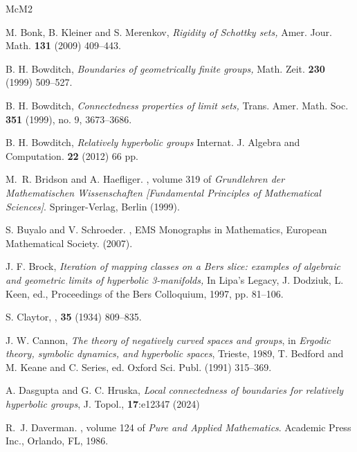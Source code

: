 \documentclass[11pt]{article}
\theoremstyle{definition}
\begin{document}
\begin{thebibliography}{McM2}

 M. Bonk, B. Kleiner and S. Merenkov, {\em Rigidity of Schottky sets,} Amer. Jour. Math. {\bf 131} (2009) 409--443.   



 B. H. Bowditch, {\it Boundaries of geometrically finite groups,} Math.  Zeit. {\bf 230} (1999) 509--527. 

 B. H.  Bowditch, {\it Connectedness properties of limit sets,} Trans. Amer. Math. Soc. {\bf 351} (1999), no. 9, 3673--3686. 

 B. H. Bowditch, {\em Relatively hyperbolic groups} Internat. J. Algebra and Computation. {\bf 22} (2012) 66 pp. 


M.~R. Bridson and A. Haefliger.
, volume 319 of {\em
  Grundlehren der Mathematischen Wissenschaften [Fundamental Principles of
  Mathematical Sciences]}.
\newblock Springer-Verlag, Berlin (1999).

S. Buyalo and V. Schroeder. 
, 
EMS Monographs in Mathematics, European Mathematical Society. (2007). 

 J. F. Brock, {\it Iteration of mapping classes on a Bers slice: examples of algebraic and geometric limits of hyperbolic 3-manifolds,} In Lipa's Legacy, J. Dodziuk, L. Keen, ed., Proceedings of the Bers Colloquium, 1997, pp. 81--106.

S. Claytor,
,
 {\bf 35} (1934) 809--835.

 J. W. Cannon,
{\it The theory of negatively curved spaces and groups}, in {\it Ergodic theory, symbolic dynamics, and hyperbolic spaces}, Trieste, 1989,
T. Bedford and M. Keane and C. Series, ed. 
Oxford Sci. Publ. (1991) 315--369. 
 


 A. Dasgupta and G. C. Hruska, {\it Local connectedness of boundaries for relatively hyperbolic groups}, J. Topol., {\bf 17}:e12347 (2024)

R.~J. Daverman.
, volume 124 of {\em Pure and
  Applied Mathematics}.
\newblock Academic Press Inc., Orlando, FL, 1986.


\end{thebibliography}
\end{document}
